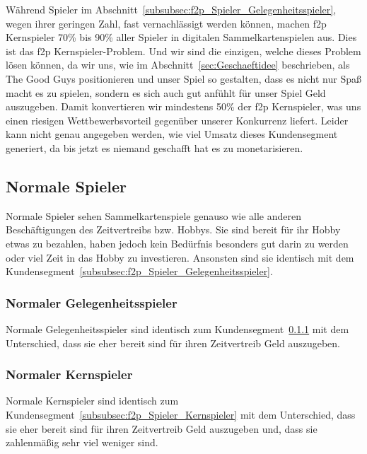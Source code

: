 \documentclass[fontsize=12, a4aper]{scrartcl}
\begin{document}
Während Spieler im Abschnitt~\ref{subsubsec:f2p_Spieler_Gelegenheitsspieler}, wegen ihrer geringen Zahl, fast vernachlässigt werden können, machen \ac{f2p} Kernspieler 70\% bis 90\% aller Spieler in digitalen Sammelkartenspielen aus. Dies ist das \glqq \acl{f2p} Kernspieler-Problem\grqq. Und wir sind die einzigen, welche dieses Problem lösen können, da wir uns, wie im Abschnitt~\ref{sec:Geschaeftidee} beschrieben, als \glqq The Good Guys\grqq{} positionieren und unser Spiel so gestalten, dass es nicht nur Spaß macht es zu spielen, sondern es sich auch gut anfühlt für unser Spiel Geld auszugeben. Damit konvertieren wir mindestens 50\% der \ac{f2p} Kernspieler, was uns einen riesigen Wettbewerbsvorteil gegenüber unserer Konkurrenz liefert. Leider kann nicht genau angegeben werden, wie viel Umsatz dieses Kundensegment generiert, da bis jetzt es niemand geschafft hat es zu monetarisieren.

\subsection{Normale Spieler} \label{subsec:Normale_Spieler}

Normale Spieler sehen Sammelkartenspiele genauso wie alle anderen Beschäftigungen des Zeitvertreibs bzw. Hobbys. Sie sind bereit für ihr Hobby etwas zu bezahlen, haben jedoch kein Bedürfnis besonders gut darin zu werden oder viel Zeit in das Hobby zu investieren. Ansonsten sind sie identisch mit dem Kundensegment~\ref{subsubsec:f2p_Spieler_Gelegenheitsspieler}.

\subsubsection{Normaler Gelegenheitsspieler} \label{subsubsec:Normaler_Gelegenheitsspieler}

Normale Gelegenheitsspieler sind identisch zum Kundensegment~\ref{subsubsec:Normaler_Gelegenheitsspieler} mit dem Unterschied, dass sie eher bereit sind für ihren Zeitvertreib Geld auszugeben.

\subsubsection{Normaler Kernspieler} \label{subsubsec:Normaler_Kernspieler}

Normale Kernspieler sind identisch zum Kundensegment~\ref{subsubsec:f2p_Spieler_Kernspieler} mit dem Unterschied, dass sie eher bereit sind für ihren Zeitvertreib Geld auszugeben und, dass sie zahlenmäßig sehr viel weniger sind.
\end{document}
